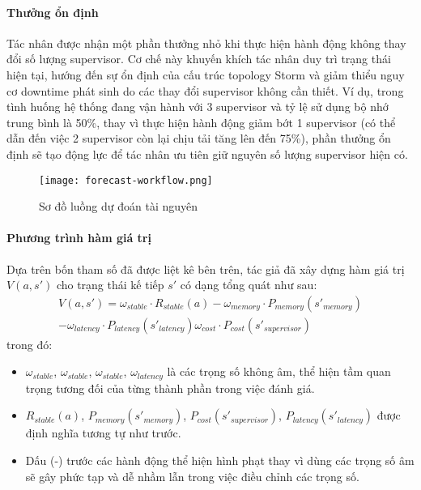 \paragraph{Thưởng ổn định}

Tác nhân được nhận một phần thưởng nhỏ khi thực hiện hành động không thay đổi số lượng supervisor. Cơ chế này khuyến khích tác nhân duy trì trạng thái hiện tại, hướng đến sự ổn định của cấu trúc topology Storm và giảm thiểu nguy cơ downtime phát sinh do các thay đổi supervisor không cần thiết. Ví dụ, trong tình huống hệ thống đang vận hành với 3 supervisor và tỷ lệ sử dụng bộ nhớ trung bình là 50\%, thay vì thực hiện hành động giảm bớt 1 supervisor (có thể dẫn đến việc 2 supervisor còn lại chịu tải tăng lên đến 75\%), phần thưởng ổn định sẽ tạo động lực để tác nhân ưu tiên giữ nguyên số lượng supervisor hiện có.

\begin{figure}[htbp]
    \texttt{[image: forecast-workflow.png]}
    \caption{Sơ đồ luồng dự đoán tài nguyên}
\end{figure}

\paragraph{Phương trình hàm giá trị}

Dựa trên bốn tham số đã được liệt kê bên trên, tác giả đã xây dựng hàm giá trị $V(a, s')$ cho trạng thái kế tiếp $s'$ có dạng tổng quát như sau:
\begin{equation}
    \begin{split}
        V(a, s') = \omega_{stable} \cdot R_{stable}(a) - \omega_{memory} \cdot P_{memory}(s'_{memory}) \\
        - \omega_{latency} \cdot P_{latency}(s'_{latency}) \omega_{cost} \cdot P_{cost}(s'_{supervisor})
    \end{split}
\end{equation}
trong đó:

\begin{itemize}
    \item $\omega_{stable}$, $\omega_{stable}$, $\omega_{stable}$, $\omega_{latency}$ là các trọng số không âm, thể hiện tầm quan trọng tương đối của từng thành phần trong việc đánh giá.
    \item $R_{stable}(a)$, $P_{memory}(s'_{memory})$, $P_{cost}(s'_{supervisor})$, $P_{latency}(s'_{latency})$ được định nghĩa tương tự như trước.
    \item Dấu (-) trước các hành động thể hiện hình phạt thay vì dùng các trọng số âm sẽ gây phức tạp và dễ nhầm lẫn trong việc điều chỉnh các trọng số.
\end{itemize}

